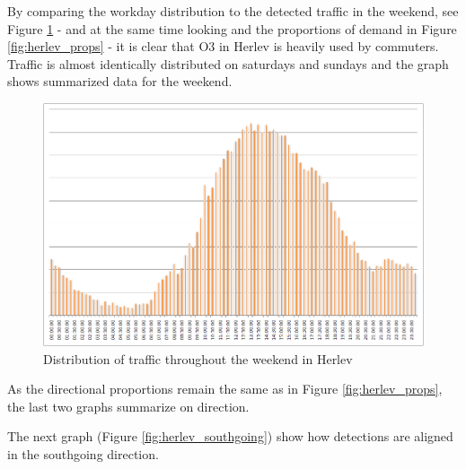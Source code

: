 By comparing the workday distribution to the detected traffic in the weekend, see Figure \ref{fig:herlev_weekends} - and at the same time looking and the proportions of demand in Figure \ref{fig:herlev_props} - it is clear that O3 in Herlev is heavily used by commuters. Traffic is almost identically distributed on saturdays and sundays and the graph shows summarized data for the weekend.

\begin{figure}[!ht]
\begin{center}
\includegraphics[scale=0.4]{herlev_weekend_distribution.png} 
\end{center}
\caption{Distribution of traffic throughout the weekend in Herlev}
\label{fig:herlev_weekends}
\end{figure}

As the directional proportions remain the same as in Figure \ref{fig:herlev_props}, the last two graphs summarize on direction.

The next graph (Figure \ref{fig:herlev_southgoing}) show how detections are aligned in the southgoing direction. 

